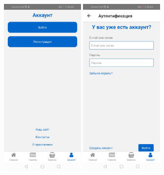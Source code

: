 \begin{figure}[!p]\centering
    \begin{minipage}{0.24\textwidth}
        \centering

        \includegraphics[height=9cm]
        {images/android/account.jpg}
    \end{minipage}
    \begin{minipage}{0.24\textwidth}
        \centering

        \includegraphics[height=9cm]
        {images/android/account-login.jpg}
    \end{minipage}
    \begin{minipage}{0.24\textwidth}
        \centering


\end{minipage}
\end{figure}
